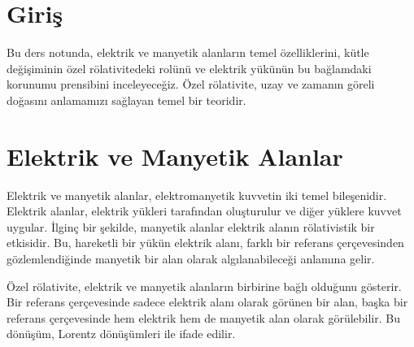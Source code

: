 \documentclass[11pt,letterpaper,twocolumn]{fenbil}
\title{}
\author{}
\date{}
\begin{document}

\section{Giriş}
Bu ders notunda, elektrik ve manyetik alanların temel özelliklerini, kütle değişiminin özel rölativitedeki rolünü ve elektrik yükünün bu bağlamdaki korunumu prensibini inceleyeceğiz. Özel rölativite, uzay ve zamanın göreli doğasını anlamamızı sağlayan temel bir teoridir.

\section{Elektrik ve Manyetik Alanlar}
Elektrik ve manyetik alanlar, elektromanyetik kuvvetin iki temel bileşenidir. Elektrik alanlar, elektrik yükleri tarafından oluşturulur ve diğer yüklere kuvvet uygular. İlginç bir şekilde, manyetik alanlar elektrik alanın rölativistik bir etkisidir. Bu, hareketli bir yükün elektrik alanı, farklı bir referans çerçevesinden gözlemlendiğinde manyetik bir alan olarak algılanabileceği anlamına gelir.

Özel rölativite, elektrik ve manyetik alanların birbirine bağlı olduğunu gösterir. Bir referans çerçevesinde sadece elektrik alanı olarak görünen bir alan, başka bir referans çerçevesinde hem elektrik hem de manyetik alan olarak görülebilir. Bu dönüşüm, Lorentz dönüşümleri ile ifade edilir.
\end{document}
